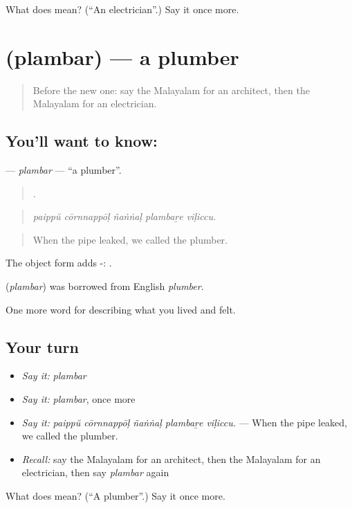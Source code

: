 \begin{tcolorbox}[breakable,colback=teal!4,colframe=teal!35!black,title={Before you move on}]
What does  mean? (\textquotedblleft{}An electrician\textquotedblright{}.) Say it once more.
\end{tcolorbox}
\section[\texorpdfstring{\ml{പ്ലംബർ} (plambar)}{പ്ലംബർ (plambar)}]{ (plambar) — a plumber}

\label{lesson:ML-C547-plambar}



\begin{quote}
Before the new one: say the Malayalam for an architect, then the Malayalam for an electrician.
\end{quote}

\subsection*{You'll want to know: }
\textbf{} — \emph{plambar} — \textquotedblleft{}a plumber\textquotedblright{}.

\begin{quote}
    .
\end{quote}

\begin{quote}
\emph{paippŭ cōrnnappōḷ ñaṅṅaḷ plambaṟe viḷiccu.}
\end{quote}

\begin{quote}
When the pipe leaked, we called the plumber.
\end{quote}

The object form adds -:  .

\begin{cousinweb}
\textbf{} (\emph{plambar}) was borrowed from English \emph{plumber}.
\end{cousinweb}

\begin{grammarlens}[title={What you've built}]
One more word for describing what you lived and felt.
\end{grammarlens}

\subsection*{Your turn}
\begin{itemize}
\raggedright
  \item \emph{Say it:} \emph{plambar}
  \item \emph{Say it:} \emph{plambar}, once more
  \item \emph{Say it:} \emph{paippŭ cōrnnappōḷ ñaṅṅaḷ plambaṟe viḷiccu.} — When the pipe leaked, we called the plumber.
  \item \emph{Recall:} say the Malayalam for an architect, then the Malayalam for an electrician, then say \emph{plambar} again
\end{itemize}

\begin{tcolorbox}[breakable,colback=teal!4,colframe=teal!35!black,title={Before you move on}]
What does  mean? (\textquotedblleft{}A plumber\textquotedblright{}.) Say it once more.
\end{tcolorbox}
